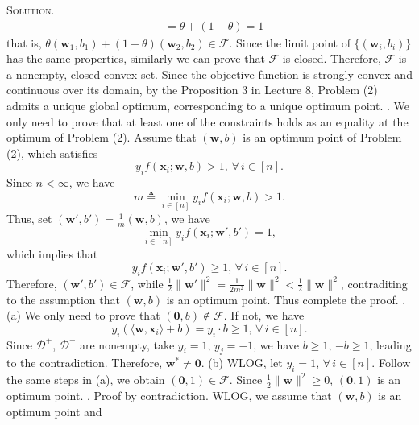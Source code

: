 \documentclass[12pt, a4paper, oneside]{ctexart}
\newenvironment{solution}{\par\noindent\textsc{Solution. }}{\\\par}
\begin{document}
\begin{solution}
\begin{align*}
    	& = \theta + (1-\theta) = 1
    \end{align*}
    that is, $\theta(\mathbf{w}_1,b_1) + (1-\theta)(\mathbf{w}_2,b_2) \in \mathcal{F}$. Since the limit point of $\{(\mathbf{w}_i,b_i)\}$ has the same properties, similarly we can prove that $\mathcal{F}$ is closed. Therefore, $\mathcal{F}$ is a nonempty, closed convex set. \newline
    Since the objective function is strongly convex and continuous over its domain, by the Proposition 3 in Lecture 8, Problem (2) admits a unique global optimum, corresponding to a unique optimum point.
    \newline{}. We only need to prove that at least one of the constraints holds as an equality at the optimum of Problem (2). \newline
    Assume that $(\mathbf{w},b)$ is an optimum point of Problem (2), which satisfies
    \[
    y_i f(\mathbf{x}_i;\mathbf{w},b) > 1,\, \forall\, i \in [n].
    \]
    Since $n < \infty$, we have
    \[
    m \triangleq \min\limits_{i \in [n]} y_i f(\mathbf{x}_i;\mathbf{w},b) > 1.
    \]
    Thus, set $(\mathbf{w}',b') = \frac{1}{m}(\mathbf{w},b)$, we have
    \[
    \min\limits_{i \in [n]} y_i f(\mathbf{x}_i;\mathbf{w}',b') = 1,
    \]
    which implies that
    \[
    y_i f(\mathbf{x}_i;\mathbf{w}',b') \geq 1,\, \forall\, i \in [n].
    \]
    Therefore, $(\mathbf{w}',b') \in \mathcal{F}$, while $\frac{1}{2}\|\mathbf{w}'\|^2 = \frac{1}{2m^2}\|\mathbf{w}\|^2 < \frac{1}{2}\|\mathbf{w}\|^2$, contraditing to the assumption that $(\mathbf{w},b)$ is an optimum point. Thus complete the proof.
    \newline{}.(a) We only need to prove that $(\mathbf{0},b) \notin \mathcal{F}$. If not, we have
    \[
    y_i(\langle\mathbf{w},\mathbf{x}_i\rangle + b) = y_i \cdot b \geq 1,\, \forall\, i \in [n].
    \]
    Since $\mathcal{D}^+$, $\mathcal{D}^-$ are nonempty, take $y_i = 1$, $y_j = -1$, we have $b \geq 1$, $-b \geq 1$, leading to the contradiction. Therefore, $\mathbf{w}^* \neq \mathbf{0}$.
    \newline\newline
    (b) WLOG, let $y_i = 1$, $\forall\, i \in [n]$. Follow the same steps in (a), we obtain $(\mathbf{0},1) \in \mathcal{F}$. Since $\frac{1}{2}\|\mathbf{w}\|^2 \geq 0$, $(\mathbf{0},1)$ is an optimum point.
    \newline{}. Proof by contradiction. WLOG, we assume that $(\mathbf{w},b)$ is an optimum point and

\end{solution}
\end{document}
